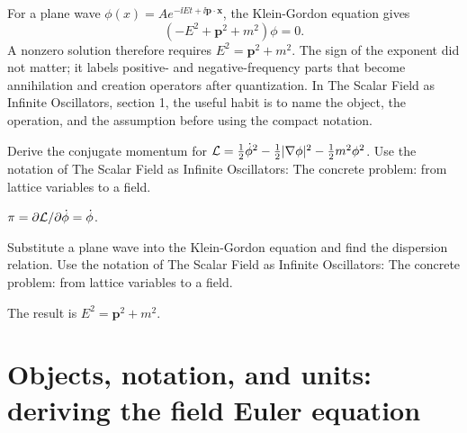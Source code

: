 \begin{example}
For a plane wave \(\phi(x)=Ae^{-\ii Et+\ii\bm p\cdot\bm x}\), the Klein-Gordon equation gives
\[
  (-E^2+\bm p^2+m^2)\phi=0.
\]
A nonzero solution therefore requires \(E^2=\bm p^2+m^2\).  The sign of the exponent did not matter; it labels positive- and negative-frequency parts that become annihilation and creation operators after quantization.  In The Scalar Field as Infinite Oscillators, section 1, the useful habit is to name the object, the operation, and the assumption before using the compact notation.
\end{example}



\begin{exercise}
Derive the conjugate momentum for \(\mathcal L=\frac12\dot\phi^2-\frac12|\nabla\phi|^2-\frac12m^2\phi^2\).  Use the notation of The Scalar Field as Infinite Oscillators: The concrete problem: from lattice variables to a field.
\begin{answer}
\(\pi=\partial\mathcal L/\partial\dot\phi=\dot\phi\).
\end{answer}
\end{exercise}

\begin{exercise}
Substitute a plane wave into the Klein-Gordon equation and find the dispersion relation.  Use the notation of The Scalar Field as Infinite Oscillators: The concrete problem: from lattice variables to a field.
\begin{answer}
The result is \(E^2=\bm p^2+m^2\).
\end{answer}
\end{exercise}



\section{Objects, notation, and units: deriving the field Euler equation}













